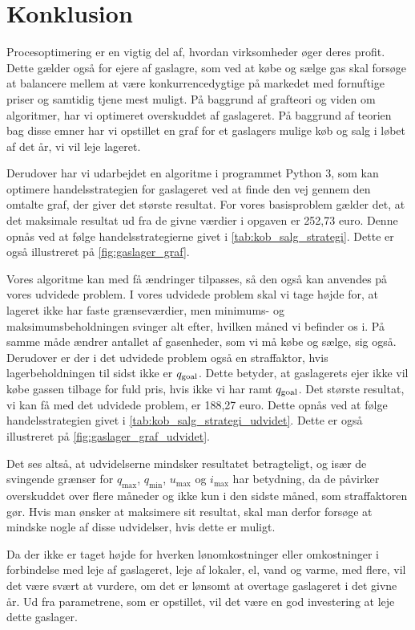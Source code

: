\chapter{Konklusion}
Procesoptimering er en vigtig del af, hvordan virksomheder øger deres profit. Dette gælder også for ejere af gaslagre, som ved at købe og sælge gas skal forsøge at balancere mellem at være konkurrencedygtige på markedet med fornuftige priser og samtidig tjene mest muligt. På baggrund af grafteori og viden om algoritmer, har vi optimeret overskuddet af gaslageret. På baggrund af teorien bag disse emner har vi opstillet en graf for et gaslagers mulige køb og salg i løbet af det år, vi vil leje lageret. 

Derudover har vi udarbejdet en algoritme i programmet Python 3, som kan optimere handelsstrategien for gaslageret ved at finde den vej gennem den omtalte graf, der giver det største resultat. For vores basisproblem gælder det, at det maksimale resultat ud fra de givne værdier i opgaven er 252,73 euro. Denne opnås ved at følge handelsstrategierne givet i \autoref{tab:kob_salg_strategi}. Dette er også illustreret på \autoref{fig:gaslager_graf}. 

Vores algoritme kan med få ændringer tilpasses, så den også kan anvendes på vores udvidede problem. I vores udvidede problem skal vi tage højde for, at lageret ikke har faste grænseværdier, men minimums- og maksimumsbeholdningen svinger alt efter, hvilken måned vi befinder os i. På samme måde ændrer antallet af gasenheder, som vi må købe og sælge, sig også. Derudover er der i det udvidede problem også en straffaktor, hvis lagerbeholdningen til sidst ikke er $q_{\textrm{goal}}$. Dette betyder, at gaslagerets ejer ikke vil købe gassen tilbage for fuld pris, hvis ikke vi har ramt $q_{\textrm{goal}}$. Det største resultat, vi kan få med det udvidede problem, er 188,27 euro. Dette opnås ved at følge handelsstrategien givet i \autoref{tab:kob_salg_strategi_udvidet}. Dette er også illustreret på \autoref{fig:gaslager_graf_udvidet}.


Det ses altså, at udvidelserne mindsker resultatet betragteligt, og især de svingende grænser for $q_{\max}$, $q_{\min}$, $u_{\max}$ og $i_{\max}$ har betydning, da de påvirker overskuddet over flere måneder og ikke kun i den sidste måned, som straffaktoren gør. Hvis man ønsker at maksimere sit resultat, skal man derfor forsøge at mindske nogle af disse udvidelser, hvis dette er muligt.

Da der ikke er taget højde for hverken lønomkostninger eller omkostninger i forbindelse med leje af gaslageret, leje af lokaler, el, vand og varme, med flere, vil det være svært at vurdere, om det er lønsomt at overtage gaslageret i det givne år. Ud fra parametrene, som er opstillet, vil det være en god investering at leje dette gaslager. 


